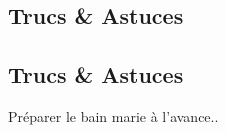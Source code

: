     \vspace{1cm}
    \hline
    \vspace{1cm}
    
    \subsection{Trucs \& Astuces}
        \subsection{Trucs \& Astuces}
	Préparer le bain marie à l'avance..

